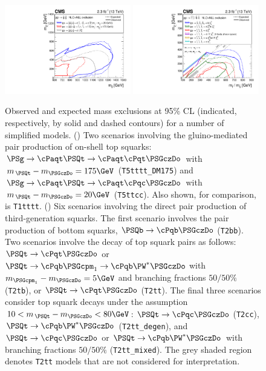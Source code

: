 \begin{figure}[htb!]
  \centering
    \includegraphics[width=0.49\textwidth]{Figure_008-a.pdf}
    \includegraphics[width=0.49\textwidth]{Figure_008-b.pdf}
    \caption{ Observed and expected mass exclusions at 95\% CL
      (indicated, respectively, by solid and dashed contours) for a
      number of simplified models. (\cmsLeft) Two scenarios involving the
      gluino-mediated pair production of on-shell top squarks:
      $\PSg\to \cPaqt\PSQt\to \cPaqt\cPqt\PSGczDo$ with $m_{\,\PSQt} -
      m_{\PSGczDo} = 175\GeV$ (\texttt{T5tttt\_DM175}) and
      $\PSg\to \cPaqt\PSQt\to \cPaqt\cPqc\PSGczDo$ with $m_{\,\PSQt} -
      m_{\PSGczDo} = 20\GeV$ (\texttt{T5ttcc}). Also shown, for
      comparison, is \texttt{T1tttt}. (\cmsRight) Six scenarios involving
      the direct pair production of third-generation squarks. The
      first scenario involves the pair production of bottom squarks,
      $\PSQb\to \cPqb\PSGczDo$ (\texttt{T2bb}). Two scenarios involve
      the decay of top squark pairs as follows: $\PSQt\to \cPqt\PSGczDo$
      or $\PSQt\to \cPqb\PSGcpm_1\to \cPqb\PW^*\PSGczDo$ with
      $m_{\PSGcpm_1} - m_{\PSGczDo} = 5\GeV$ and branching fractions
      $50/50\%$ (\texttt{T2tb}), or $\PSQt\to \cPqt\PSGczDo$
      (\texttt{T2tt}). The final three scenarios consider top squark
      decays under the assumption $10 < m_{\,\PSQt} - m_{\PSGczDo} <
      80\GeV$: $\PSQt\to \cPqc\PSGczDo$ (\texttt{T2cc}),
      $\PSQt\to \cPqb\PW^*\PSGczDo$ (\texttt{T2tt\_degen}), and
      $\PSQt\to \cPqc\PSGczDo$ or $\PSQt\to \cPqb\PW^*\PSGczDo$ with
      branching fractions $50/50\%$ (\texttt{T2tt\_mixed}). The grey
      shaded region denotes \texttt{T2tt} models that are not
      considered for interpretation. }
    \label{fig:limits-sms-2}
\end{figure}

